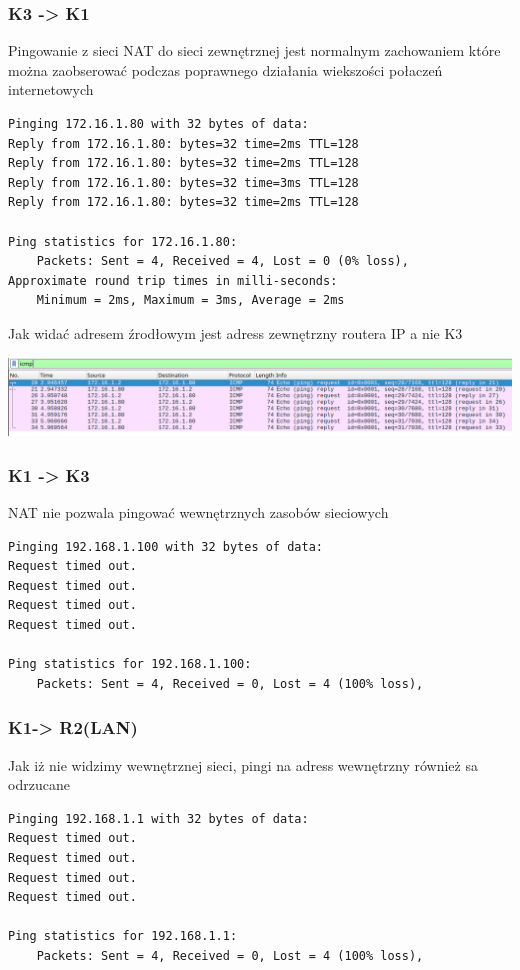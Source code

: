 \documentclass[11pt]{article}
\begin{document}
\subsubsection{K3 -> K1}
\label{sec:org43249dc}
Pingowanie z sieci NAT do sieci zewnętrznej jest normalnym zachowaniem które można zaobserować podczas poprawnego działania wiekszości połaczeń internetowych
\begin{verbatim}
Pinging 172.16.1.80 with 32 bytes of data:
Reply from 172.16.1.80: bytes=32 time=2ms TTL=128
Reply from 172.16.1.80: bytes=32 time=2ms TTL=128
Reply from 172.16.1.80: bytes=32 time=3ms TTL=128
Reply from 172.16.1.80: bytes=32 time=2ms TTL=128

Ping statistics for 172.16.1.80:
    Packets: Sent = 4, Received = 4, Lost = 0 (0% loss),
Approximate round trip times in milli-seconds:
    Minimum = 2ms, Maximum = 3ms, Average = 2ms
\end{verbatim}
Jak widać adresem źrodłowym jest adress zewnętrzny routera IP a nie K3
\begin{center}
\includegraphics[width=.9\linewidth]{./K1/przed/k1_pingk3dok1.png}
\end{center}

\subsubsection{K1 -> K3}
\label{sec:org945542a}
NAT nie pozwala pingować wewnętrznych zasobów sieciowych
\begin{verbatim}
Pinging 192.168.1.100 with 32 bytes of data:
Request timed out.
Request timed out.
Request timed out.
Request timed out.

Ping statistics for 192.168.1.100:
    Packets: Sent = 4, Received = 0, Lost = 4 (100% loss),
\end{verbatim}
\subsubsection{K1-> R2(LAN)}
\label{sec:org2559969}
Jak iż nie widzimy wewnętrznej sieci, pingi na adress wewnętrzny również sa odrzucane
\begin{verbatim}
Pinging 192.168.1.1 with 32 bytes of data:
Request timed out.
Request timed out.
Request timed out.
Request timed out.

Ping statistics for 192.168.1.1:
    Packets: Sent = 4, Received = 0, Lost = 4 (100% loss),
\end{verbatim}
\end{document}
